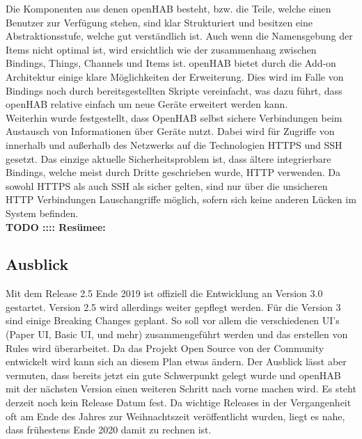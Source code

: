 Die Komponenten aus denen openHAB besteht, bzw. die Teile, welche einen Benutzer zur Verfügung stehen, sind klar Strukturiert und besitzen eine Abstraktionsstufe, welche gut verständlich ist. Auch wenn die Namensgebung der Items nicht optimal ist, wird ersichtlich wie der zusammenhang zwischen Bindings, Things, Channels und Items ist. openHAB bietet durch die Add-on Architektur einige klare Möglichkeiten der Erweiterung. Dies wird im Falle von Bindings noch durch bereitsgestellten Skripte vereinfacht, was dazu führt, dass openHAB relative einfach um neue Geräte erweitert werden kann.
\\
Weiterhin wurde festgestellt, dass OpenHAB selbst sichere Verbindungen beim Austausch von Informationen über Geräte nutzt. Dabei wird für Zugriffe von innerhalb und außerhalb des Netzwerks auf die Technologien HTTPS und SSH gesetzt. Das einzige aktuelle Sicherheitsproblem ist, dass ältere integrierbare Bindings, welche meist durch Dritte geschrieben wurde, HTTP verwenden. Da sowohl HTTPS als auch SSH als sicher gelten, sind nur über die unsicheren HTTP Verbindungen Lauschangriffe möglich, sofern sich keine anderen Lücken im System befinden.
\\
\textbf{TODO :::: Resümee:}



\subsection{Ausblick}
Mit dem Release 2.5 Ende 2019 ist offiziell die Entwicklung an Version 3.0 gestartet. Version 2.5 wird allerdings weiter gepflegt werden. Für die Version 3 sind einige Breaking Changes geplant. So soll vor allem die verschiedenen UI's (Paper UI, Basic UI, und mehr) zusammengeführt werden und das erstellen von Rules wird überarbeitet. Da das Projekt Open Source von der Community entwickelt wird kann sich an diesem Plan etwas ändern. Der Ausblick lässt aber vermuten, dass bereits jetzt ein gute Schwerpunkt gelegt wurde und openHAB mit der nächsten Version einen weiteren Schritt nach vorne machen wird. Es steht derzeit noch kein Release Datum fest. Da wichtige Releases in der Vergangenheit oft am Ende des Jahres zur Weihnachtszeit veröffentlicht wurden, liegt es nahe, dass frühestens Ende 2020 damit zu rechnen ist.

